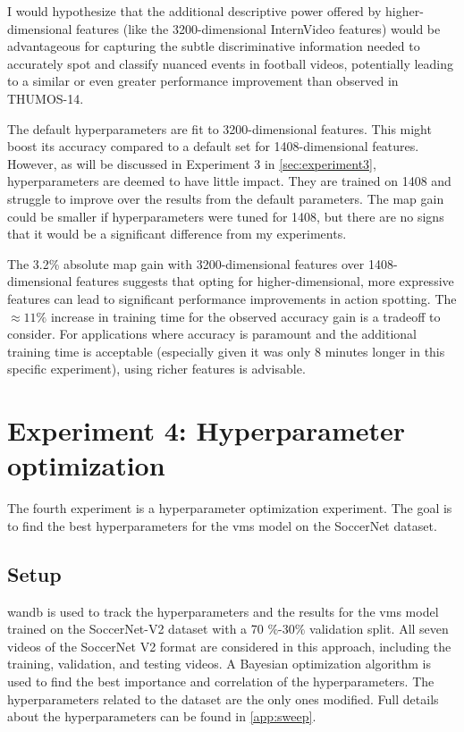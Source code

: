 I would hypothesize that the additional descriptive power offered by higher-dimensional features (like the 3200-dimensional InternVideo features) would be advantageous for capturing the subtle discriminative information needed to accurately spot and classify nuanced events in football videos, potentially leading to a similar or even greater performance improvement than observed in THUMOS-14.






The default hyperparameters are fit to 3200-dimensional features. This might boost its accuracy compared to a default set for 1408-dimensional features. However, as will be discussed in Experiment 3 in \autoref{sec:experiment3}, hyperparameters are deemed to have little impact. They are trained on 1408 and struggle to improve over the results from the default parameters. The \acrshort{map} gain could be smaller if hyperparameters were tuned for 1408, but there are no signs that it would be a significant difference from my experiments. 



The 3.2\% absolute \acrshort{map} gain with 3200-dimensional features over 1408-dimensional features suggests that opting for higher-dimensional, more expressive features can lead to significant performance improvements in action spotting. The \(\approx11\%\) increase in training time for the observed accuracy gain is a tradeoff to consider. For applications where accuracy is paramount and the additional training time is acceptable (especially given it was only 8 minutes longer in this specific experiment), using richer features is advisable.


\section{Experiment 4: Hyperparameter optimization}
\label{sec:experiment4}

The fourth experiment is a hyperparameter optimization experiment.
The goal is to find the best hyperparameters for the \acrshort{vms} model on the SoccerNet dataset.

\subsection{Setup}
\label{ssec:ex4_setup}

\acrlong{wandb} is used to track the hyperparameters and the results for the \acrshort{vms} model trained on the SoccerNet-V2 dataset with a 70 \(\%\)-30\(\%\) validation split. All seven videos of the SoccerNet V2 format are considered in this approach, including the training, validation, and testing videos. A Bayesian optimization algorithm is used to find the best importance and correlation of the hyperparameters. The hyperparameters related to the dataset are the only ones modified. Full details about the hyperparameters can be found in \autoref{app:sweep}.

